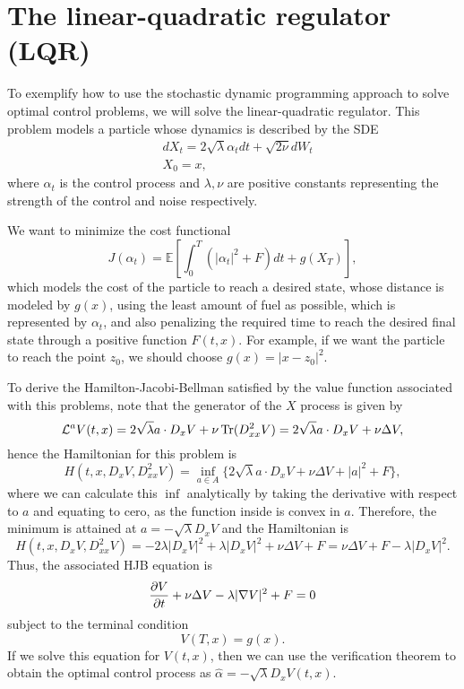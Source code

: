 \section*{The linear-quadratic regulator (LQR)}
To exemplify how to use the stochastic dynamic programming approach to solve optimal control problems, we will solve the linear-quadratic regulator. This problem models a particle whose dynamics is described by the SDE
\begin{equation}
	\begin{split}
		&dX_t=2\sqrt{\lambda}\alpha_t dt+\sqrt{2\nu}dW_t\\
		&X_0=x,
	\end{split}
\end{equation} 
where $\alpha_t$ is the control process and $\lambda,\nu$ are positive constants representing the strength of the control and noise respectively. 

We want to minimize the cost functional
\begin{equation}
	J(\alpha_t)=\mathbb{E}\left[\int_{0}^{T}(|\alpha_t|^2+F) dt +g(X_T)\right],
\end{equation}
which models the cost of the particle to reach a desired state, whose distance is modeled by $g(x)$, using the least amount of fuel as possible, which is represented by $\alpha_t$, and also penalizing the required time to reach the desired final state through a positive function $F(t,x)$. For example, if we want the particle to reach the point $z_0$, we should choose $g(x)=|x-z_0|^2$.

To derive the Hamilton-Jacobi-Bellman satisfied by the value function associated with this problems, note that the generator of the $X$ process is given by
\begin{equation}
	\mathcal{L}^a V(t,x)=2 \sqrt{\lambda} a\cdot D_x V+\nu\operatorname{Tr}(D_{xx}^2 V)= 2 \sqrt{\lambda}a\cdot D_x V +\nu\Delta V,
\end{equation}
hence the Hamiltonian for this problem is 
\begin{equation}
	H(t,x,D_x V,D_{xx}^2 V)=\inf_{a\in A}\{2 \sqrt{\lambda}a\cdot D_x V +\nu\Delta V+|a|^2+F\},
\end{equation}
where we can calculate this $\inf$ analytically by taking the derivative with respect to $a$ and equating to cero, as the function inside is convex in $a$. Therefore, the minimum is attained at $a=-\sqrt{\lambda}D_x V$ and the Hamiltonian is 
\begin{equation}
	H(t,x,D_x V,D_{xx}^2 V)=-2\lambda|D_x V|^2+\lambda|D_x V|^2+\nu\Delta V+F=\nu\Delta V+F -\lambda |D_x V|^2.
\end{equation}
Thus, the associated HJB equation is 
\begin{equation}
	\frac{\partial V}{\partial t}+\nu\Delta V -\lambda|\nabla V|^2+F=0
\end{equation}
subject to the terminal condition
\begin{equation}
	V(T,x)=g(x).
\end{equation}
If we solve this equation for $V(t,x)$, then we can use the verification theorem to obtain the optimal control process as $\hat{\alpha}=-\sqrt{\lambda}D_x V(t,x)$. 

